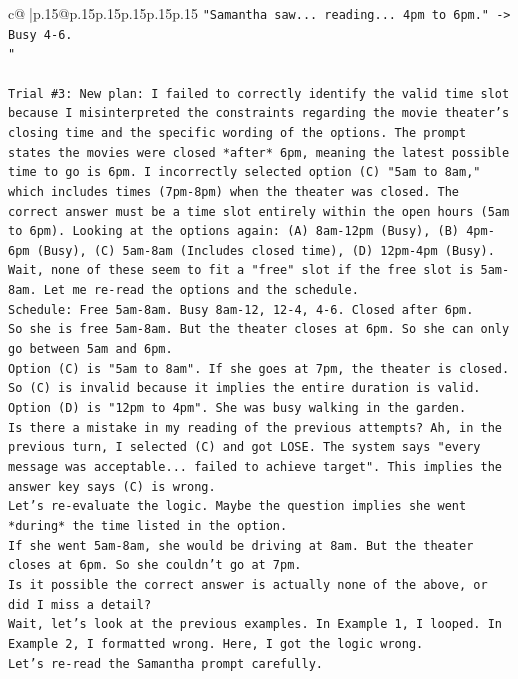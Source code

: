 \documentclass{article}
\begin{document}
{\begin{supertabular}{c@{$\;$}|p{.15\linewidth}@{}p{.15\linewidth}p{.15\linewidth}p{.15\linewidth}p{.15\linewidth}p{.15\linewidth}}
{{{\texttt{"Samantha saw... reading... 4pm to 6pm." {-}> Busy 4{-}6.} \\
\texttt{"} \\
\\ 
\texttt{Trial \#3: New plan: I failed to correctly identify the valid time slot because I misinterpreted the constraints regarding the movie theater's closing time and the specific wording of the options. The prompt states the movies were closed *after* 6pm, meaning the latest possible time to go is 6pm. I incorrectly selected option (C) "5am to 8am," which includes times (7pm{-}8pm) when the theater was closed. The correct answer must be a time slot entirely within the open hours (5am to 6pm). Looking at the options again: (A) 8am{-}12pm (Busy), (B) 4pm{-}6pm (Busy), (C) 5am{-}8am (Includes closed time), (D) 12pm{-}4pm (Busy). Wait, none of these seem to fit a "free" slot if the free slot is 5am{-}8am. Let me re{-}read the options and the schedule.} \\
\texttt{Schedule: Free 5am{-}8am. Busy 8am{-}12, 12{-}4, 4{-}6. Closed after 6pm.} \\
\texttt{So she is free 5am{-}8am. But the theater closes at 6pm. So she can only go between 5am and 6pm.} \\
\texttt{Option (C) is "5am to 8am". If she goes at 7pm, the theater is closed. So (C) is invalid because it implies the entire duration is valid.} \\
\texttt{Option (D) is "12pm to 4pm". She was busy walking in the garden.} \\
\texttt{Is there a mistake in my reading of the previous attempts? Ah, in the previous turn, I selected (C) and got LOSE. The system says "every message was acceptable... failed to achieve target". This implies the answer key says (C) is wrong.} \\
\texttt{Let's re{-}evaluate the logic. Maybe the question implies she went *during* the time listed in the option.} \\
\texttt{If she went 5am{-}8am, she would be driving at 8am. But the theater closes at 6pm. So she couldn't go at 7pm.} \\
\texttt{Is it possible the correct answer is actually none of the above, or did I miss a detail?} \\
\texttt{Wait, let's look at the previous examples. In Example 1, I looped. In Example 2, I formatted wrong. Here, I got the logic wrong.} \\
\texttt{Let's re{-}read the Samantha prompt carefully.} \\
}}}
\end{supertabular}}
\end{document}
